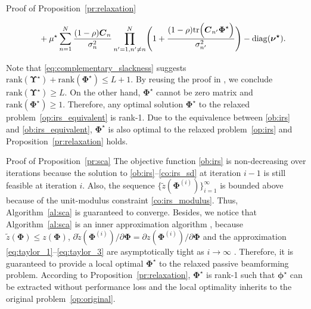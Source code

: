 \documentclass[journal]{IEEEtran}
\begin{document}
\begin{appendix}
\begin{subsection}{Proof of Proposition~\ref{pr:relaxation}}
\begin{figure}[!b]
\begin{align}
					& \quad + \mu^\star \sum_{n=1}^N \frac{(1-\rho) \boldsymbol{C}_n}{\sigma_n^2} \prod_{n'=1,n' \ne n}^N \Biggl(
						1 + \frac{(1-\rho)\mathrm{tr}\Bigl(
							\boldsymbol{C}_{n'} \boldsymbol{\Phi}^\star
						\Bigr)}{\sigma_{n'}^2}
					\Biggr) - \mathrm{diag}(\boldsymbol{\nu^\star}).
				\end{align}
			\end{figure}
			Note that \eqref{eq:complementary_slackness} suggests $\mathrm{rank}(\boldsymbol{\Upsilon}^\star)+\mathrm{rank}(\boldsymbol{\Phi}^\star) \le L+1$. By reusing the proof in \cite[Appendix~A]{Xu2020}, we conclude $\mathrm{rank}(\boldsymbol{\Upsilon}^\star) \ge L$. On the other hand, $\boldsymbol{\Phi}^\star$ cannot be zero matrix and $\mathrm{rank}(\boldsymbol{\Phi}^\star) \ge 1$. Therefore, any optimal solution $\boldsymbol{\Phi}^\star$ to the relaxed problem~\eqref{op:irs_equivalent} is rank-\num{1}. Due to the equivalence between \eqref{ob:irs} and \eqref{ob:irs_equivalent}, $\boldsymbol{\Phi}^\star$ is also optimal to the relaxed problem~\eqref{op:irs} and Proposition~\ref{pr:relaxation} holds.
		\end{subsection}

		\begin{subsection}{Proof of Proposition~\ref{pr:sca}}\label{ap:sca}
			The objective function \eqref{ob:irs} is non-decreasing over iterations because the solution to \eqref{ob:irs}--\eqref{co:irs_sd} at iteration $i-1$ is still feasible at iteration $i$. Also, the sequence $\{\tilde{z}(\boldsymbol{\Phi}^{(i)})\}_{i=1}^{\infty}$ is bounded above because of the unit-modulus constraint \eqref{co:irs_modulus}. Thus, Algorithm~\ref{al:sca} is guaranteed to converge. Besides, we notice that Algorithm~\ref{al:sca} is an inner approximation algorithm \cite{Marks1978a}, because $\tilde{z}(\boldsymbol{\Phi}) \le z(\boldsymbol{\Phi})$, $\partial\tilde{z}(\boldsymbol{\Phi}^{(i)})/\partial\boldsymbol{\Phi}=\partial z(\boldsymbol{\Phi}^{(i)})/\partial\boldsymbol{\Phi}$ and the approximation \eqref{eq:taylor_1}--\eqref{eq:taylor_3} are asymptotically tight as $i \to \infty$ \cite{Li2013}. Therefore, it is guaranteed to provide a local optimal $\boldsymbol{\Phi}^{\star}$ to the relaxed passive beamforming problem. According to Proposition~\ref{pr:relaxation}, $\boldsymbol{\Phi}^{\star}$ is rank-\num{1} such that $\boldsymbol{\phi}^{\star}$ can be extracted without performance loss and the local optimality inherits to the original problem~\eqref{op:original}.
		\end{subsection}


\end{appendix}
\end{document}
